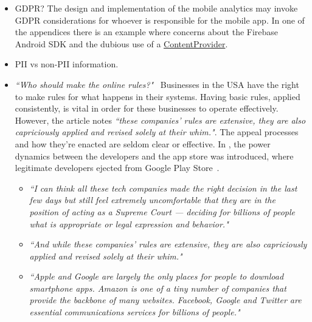 \begin{itemize}
    \item GDPR? The design and implementation of the mobile analytics may invoke GDPR considerations for whoever is responsible for the mobile app. In one of the appendices there is an example where concerns about the Firebase Android SDK and the dubious use of a \href{Firebase-SDK-ContentProvider}{ContentProvider}.
    \item PII vs non-PII information.
    \item \emph{``Who should make the online rules?"}~ Businesses in the USA have the right to make rules for what happens in their systems. Having basic rules, applied consistently, is vital in order for these businesses to operate effectively. However, the article notes \emph{``these companies’ rules are extensive, they are also capriciously applied and revised solely at their whim."}. The appeal processes and how they're enacted are seldom clear or effective. In , the power dynamics between the developers and the app store was introduced, where legitimate developers ejected from Google Play Store~. %
    \begin{itemize}
        \item \emph{``I can think all these tech companies made the right decision in the last few days but still feel extremely uncomfortable that they are in the position of acting as a Supreme Court — deciding for billions of people what is appropriate or legal expression and behavior."}
        \item \emph{``And while these companies’ rules are extensive, they are also capriciously applied and revised solely at their whim."}
        \item \emph{``Apple and Google are largely the only places for people to download smartphone apps. Amazon is one of a tiny number of companies that provide the backbone of many websites. Facebook, Google and Twitter are essential communications services for billions of people."}
    \end{itemize}

\end{itemize}

